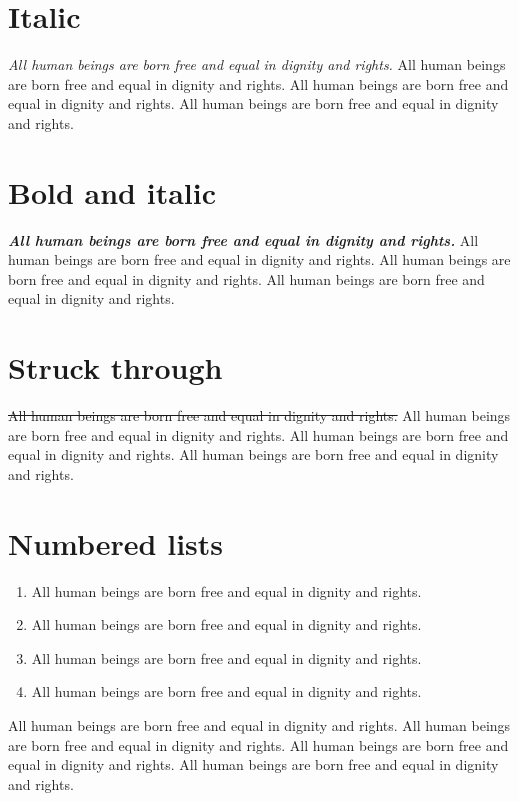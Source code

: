 \documentclass[
  titlepage,
  openright,
  DIV=calc,
  toc=listof,
  listof=nochaptergap]{scrbook}
\providecommand{\tightlist}{%
  \setlength{\itemsep}{0pt}\setlength{\parskip}{0pt}}
\begin{document}
\section{Italic}\label{italic}

\emph{All human beings are born free and equal in dignity and rights.}
All human beings are born free and equal in dignity and rights. All
human beings are born free and equal in dignity and rights. All human
beings are born free and equal in dignity and rights.

\section{Bold and italic}\label{bold-and-italic}

\textbf{\emph{All human beings are born free and equal in dignity and
rights.}} All human beings are born free and equal in dignity and
rights. All human beings are born free and equal in dignity and rights.
All human beings are born free and equal in dignity and rights.

\section{Struck through}\label{struck-through}

\st{All human beings are born free and equal in dignity and rights.} All
human beings are born free and equal in dignity and rights. All human
beings are born free and equal in dignity and rights. All human beings
are born free and equal in dignity and rights.

\section{Numbered lists}\label{numbered-lists}

\begin{enumerate}
\def\labelenumi{\arabic{enumi}.}
\tightlist
\item
  All human beings are born free and equal in dignity and rights.
\item
  All human beings are born free and equal in dignity and rights.
\item
  All human beings are born free and equal in dignity and rights.
\item
  All human beings are born free and equal in dignity and rights.
\end{enumerate}

All human beings are born free and equal in dignity and rights. All
human beings are born free and equal in dignity and rights. All human
beings are born free and equal in dignity and rights. All human beings
are born free and equal in dignity and rights.
\end{document}
